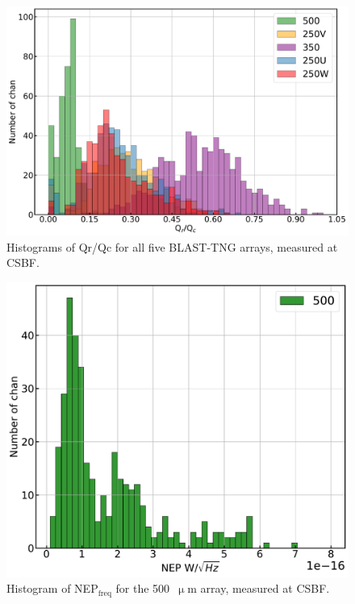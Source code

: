 \begin{figure}[!htbp]
\centering
\includegraphics[width=\textwidth]{figures/blast_data/hist/PAL_QrQc_hist}
\caption[~Histograms of  for all five BLAST-TNG arrays, measured at CSBF.]{Histograms of \gls{Qr}/\gls{Qc} for all five BLAST-TNG arrays, measured at CSBF.}
\label{fig:pal qrqc hist}
\end{figure}

\begin{figure}[!htbp]
\centering
\includegraphics[width=\textwidth]{figures/blast_data/hist/PAL_NEP_hist_R1}
\caption[~Histogram of  for the 500~ array, measured at CSBF.]{Histogram of NEP$_{\mathrm{freq}}$ for the 500~$\upmu$m array, measured at CSBF.}
\label{fig:pal nep 500}
\end{figure}


